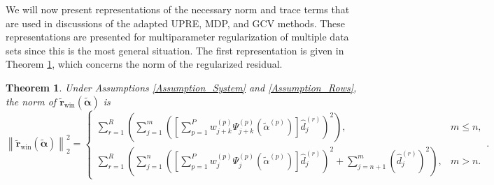 \documentclass[12pt]{article}
\newcommand{\rVec}{\mathbf{r}}	%
\newcommand{\regparam}{\alpha}  %
\newcommand{\regparamVec}{\bm{\regparam}}   %
\newcommand{\regparamBig}{\widetilde{\regparam}}   %
\newcommand{\regparamVecBig}{\widetilde{\regparamVec}}   %
\newcommand{\rBig}{\widetilde{\rVec}}	%
\newcommand{\rWinBig}{\rBig_{\text{win}}}	%
\newtheorem{theorem}{Theorem}[section]
\begin{document}
We will now present representations of the necessary norm and trace terms that are used in discussions of the adapted UPRE, MDP, and GCV methods. These representations are presented for multiparameter regularization of multiple data sets since this is the most general situation. The first representation is given in Theorem \ref{thm:Regularized residual}, which concerns the norm of the regularized residual.

\begin{theorem}
\label{thm:Regularized residual}
Under Assumptions \ref{Assumption_System} and \ref{Assumption_Rows}, the norm of $\rWinBig(\regparamVecBig)$ is
\[\left\|\rWinBig(\regparamVecBig)\right\|_2^2 = \begin{cases}
\sum_{r=1}^{R} \left(\sum_{j=1}^{m} \left(\left[\sum_{p=1}^{P} w_{j+k}^{(p)}\Psi_{j+k}^{(p)}\left(\regparamBig^{(p)}\right)\right] \hat{d}_j^{(r)}\right)^2\right), & m \leq n, \\
\sum_{r=1}^{R} \left(\sum_{j=1}^{n} \left(\left[\sum_{p=1}^{P} w_{j}^{(p)}\Psi_{j}^{(p)}\left(\regparamBig^{(p)}\right)\right] \hat{d}_j^{(r)}\right)^2 + \sum_{j=n+1}^{m} \left(\hat{d}_j^{(r)}\right)^2\right), & m > n.
\end{cases}.\]
\end{theorem}
\end{document}

